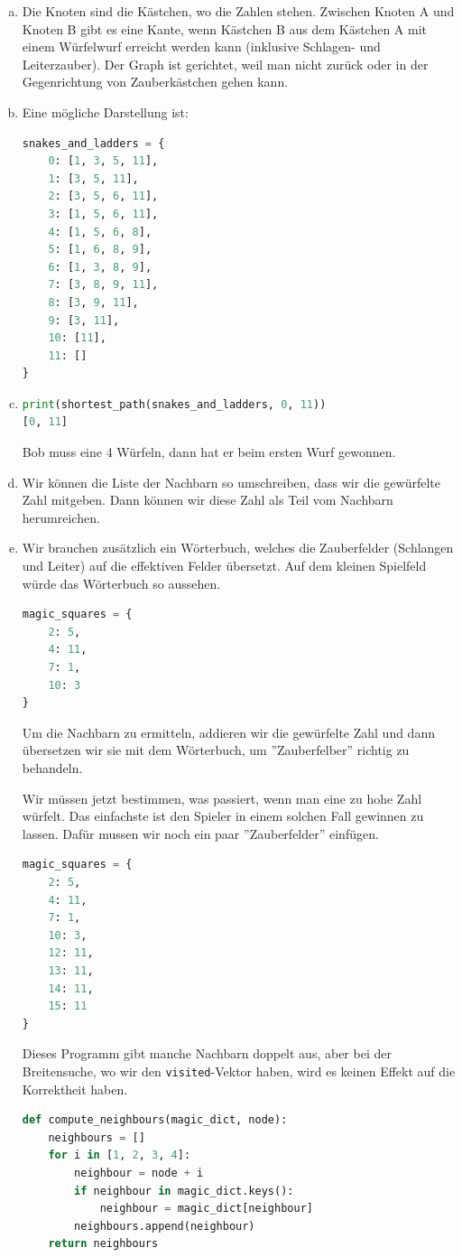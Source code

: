 \begin{enumerate}[(a)]
    \item Die Knoten sind die Kästchen, wo die Zahlen stehen. Zwischen Knoten A und Knoten B gibt es eine Kante, wenn Kästchen B aus dem Kästchen A mit einem Würfelwurf erreicht werden kann (inklusive Schlagen- und Leiterzauber). Der Graph ist gerichtet, weil man nicht zurück oder in der Gegenrichtung von Zauberkästchen gehen kann.
    \item Eine mögliche Darstellung ist:
    \begin{lstlisting}[language=Python]
snakes_and_ladders = {
    0: [1, 3, 5, 11],
    1: [3, 5, 11],
    2: [3, 5, 6, 11],
    3: [1, 5, 6, 11],
    4: [1, 5, 6, 8],
    5: [1, 6, 8, 9],
    6: [1, 3, 8, 9],
    7: [3, 8, 9, 11],
    8: [3, 9, 11],
    9: [3, 11],
    10: [11],
    11: []
}
    \end{lstlisting}
    
    \item
    \begin{lstlisting}[language=Python]
print(shortest_path(snakes_and_ladders, 0, 11))
[0, 11]
    \end{lstlisting}
    Bob muss eine 4 Würfeln, dann hat er beim ersten Wurf gewonnen.
    
    \item Wir können die Liste der Nachbarn so umschreiben, dass wir die gewürfelte Zahl mitgeben. Dann können wir diese Zahl als Teil vom Nachbarn herumreichen.
    \item Wir brauchen zusätzlich ein Wörterbuch, welches die Zauberfelder (Schlangen und Leiter) auf die effektiven Felder übersetzt. Auf dem kleinen Spielfeld würde das Wörterbuch so aussehen.
    \begin{lstlisting}[language=Python]
magic_squares = {
    2: 5,
    4: 11,
    7: 1,
    10: 3
}
    \end{lstlisting}
    Um die Nachbarn zu ermitteln, addieren wir die gewürfelte Zahl und dann übersetzen wir sie mit dem Wörterbuch, um ''Zauberfelber'' richtig zu behandeln.
    
    Wir müssen jetzt bestimmen, was passiert, wenn man eine zu hohe Zahl würfelt. Das einfachste ist den Spieler in einem solchen Fall gewinnen zu lassen. Dafür mussen wir noch ein paar ''Zauberfelder'' einfügen.
    \begin{lstlisting}[language=Python]
magic_squares = {
    2: 5,
    4: 11,
    7: 1,
    10: 3,
    12: 11,
    13: 11,
    14: 11,
    15: 11
}
    \end{lstlisting}
    Dieses Programm gibt manche Nachbarn doppelt aus, aber bei der Breitensuche, wo wir den \texttt{visited}-Vektor haben, wird es keinen Effekt auf die Korrektheit haben.
    \begin{lstlisting}[language=Python]
def compute_neighbours(magic_dict, node):
    neighbours = []
    for i in [1, 2, 3, 4]:
        neighbour = node + i
        if neighbour in magic_dict.keys():
            neighbour = magic_dict[neighbour]
        neighbours.append(neighbour)
    return neighbours
    \end{lstlisting}{}
    

\end{enumerate}
